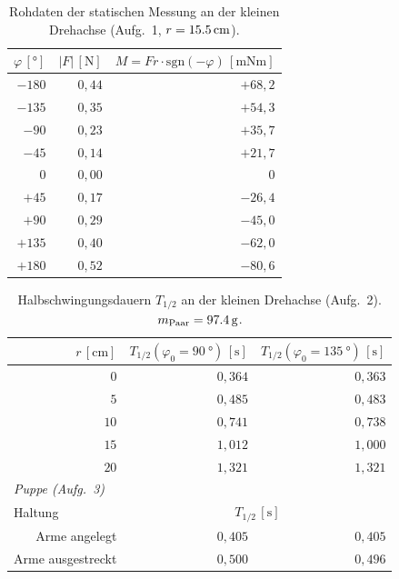 \documentclass[11pt,a4paper]{article}
\begin{document}
\begin{table}[H]
\centering
\caption{Rohdaten der statischen Messung an der kleinen Drehachse (Aufg.~1, $r=\SI{15{,}5}{\centi\metre}$).}
\label{tab:roh_stat_puppe}
\small
\begin{tabular}{rrr}
\toprule
$\varphi\,[\si{\degree}]$ & $\lvert F\rvert\,[\si{\newton}]$ & $M = F r\cdot\mathrm{sgn}(-\varphi)\,[\si{\milli\newton\metre}]$ \\
\midrule
$-180$ & $0{,}44$ & $+68{,}2$ \\
$-135$ & $0{,}35$ & $+54{,}3$ \\
$-90$  & $0{,}23$ & $+35{,}7$ \\
$-45$  & $0{,}14$ & $+21{,}7$ \\
$0$    & $0{,}00$ & $0$       \\
$+45$  & $0{,}17$ & $-26{,}4$ \\
$+90$  & $0{,}29$ & $-45{,}0$ \\
$+135$ & $0{,}40$ & $-62{,}0$ \\
$+180$ & $0{,}52$ & $-80{,}6$ \\
\bottomrule
\end{tabular}
\end{table}

\begin{table}[H]
\centering
\caption{Halbschwingungsdauern $T_{1/2}$ an der kleinen Drehachse (Aufg.~2). $m_{\text{Paar}}=\SI{97{,}4}{\gram}$.}
\label{tab:puppe}
\small
\begin{tabular}{rrr}
\toprule
$r\,[\si{\centi\metre}]$ & $T_{1/2}(\varphi_{0}=\SI{90}{\degree})\,[\si{\second}]$ & $T_{1/2}(\varphi_{0}=\SI{135}{\degree})\,[\si{\second}]$ \\
\midrule
$0$  & $0{,}364$ & $0{,}363$ \\
$5$  & $0{,}485$ & $0{,}483$ \\
$10$ & $0{,}741$ & $0{,}738$ \\
$15$ & $1{,}012$ & $1{,}000$ \\
$20$ & $1{,}321$ & $1{,}321$ \\
\midrule
\multicolumn{3}{l}{\emph{Puppe (Aufg.~3)}}\\
\midrule
\multicolumn{1}{l}{Haltung} & \multicolumn{2}{c}{$T_{1/2}\,[\si{\second}]$} \\
Arme angelegt        & $0{,}405$ & $0{,}405$ \\
Arme ausgestreckt    & $0{,}500$ & $0{,}496$ \\
\bottomrule
\end{tabular}
\end{table}
\end{document}
